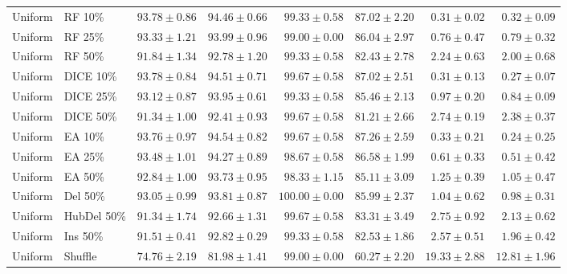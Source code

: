 {\begin{longtable}{llrrrrrr}
Uniform & RF 10\% & $93.78\pm0.86$ & $94.46\pm0.66$ & $99.33\pm0.58$ & $87.02\pm2.20$ & $0.31\pm0.02$ & $0.32\pm0.09$ \\
Uniform & RF 25\% & $93.33\pm1.21$ & $93.99\pm0.96$ & $99.00\pm0.00$ & $86.04\pm2.97$ & $0.76\pm0.47$ & $0.79\pm0.32$ \\
Uniform & RF 50\% & $91.84\pm1.34$ & $92.78\pm1.20$ & $99.33\pm0.58$ & $82.43\pm2.78$ & $2.24\pm0.63$ & $2.00\pm0.68$ \\
Uniform & DICE 10\% & $93.78\pm0.84$ & $94.51\pm0.71$ & $99.67\pm0.58$ & $87.02\pm2.51$ & $0.31\pm0.13$ & $0.27\pm0.07$ \\
Uniform & DICE 25\% & $93.12\pm0.87$ & $93.95\pm0.61$ & $99.33\pm0.58$ & $85.46\pm2.13$ & $0.97\pm0.20$ & $0.84\pm0.09$ \\
Uniform & DICE 50\% & $91.34\pm1.00$ & $92.41\pm0.93$ & $99.67\pm0.58$ & $81.21\pm2.66$ & $2.74\pm0.19$ & $2.38\pm0.37$ \\
Uniform & EA 10\% & $93.76\pm0.97$ & $94.54\pm0.82$ & $99.67\pm0.58$ & $87.26\pm2.59$ & $0.33\pm0.21$ & $0.24\pm0.25$ \\
Uniform & EA 25\% & $93.48\pm1.01$ & $94.27\pm0.89$ & $98.67\pm0.58$ & $86.58\pm1.99$ & $0.61\pm0.33$ & $0.51\pm0.42$ \\
Uniform & EA 50\% & $92.84\pm1.00$ & $93.73\pm0.95$ & $98.33\pm1.15$ & $85.11\pm3.09$ & $1.25\pm0.39$ & $1.05\pm0.47$ \\
Uniform & Del 50\% & $93.05\pm0.99$ & $93.81\pm0.87$ & $100.00\pm0.00$ & $85.99\pm2.37$ & $1.04\pm0.62$ & $0.98\pm0.31$ \\
Uniform & HubDel 50\% & $91.34\pm1.74$ & $92.66\pm1.31$ & $99.67\pm0.58$ & $83.31\pm3.49$ & $2.75\pm0.92$ & $2.13\pm0.62$ \\
Uniform & Ins 50\% & $91.51\pm0.41$ & $92.82\pm0.29$ & $99.33\pm0.58$ & $82.53\pm1.86$ & $2.57\pm0.51$ & $1.96\pm0.42$ \\
Uniform & Shuffle & $74.76\pm2.19$ & $81.98\pm1.41$ & $99.00\pm0.00$ & $60.27\pm2.20$ & $19.33\pm2.88$ & $12.81\pm1.96$ \\
\end{longtable}
}

